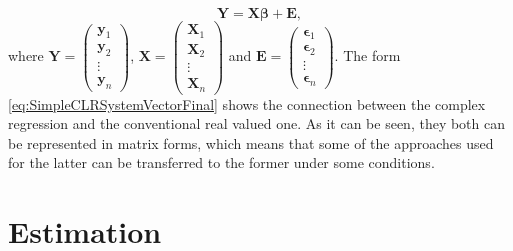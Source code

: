 \documentclass[
]{book}
\begin{document}
\begin{equation}
    \mathbf{Y} = \mathbf{X} \boldsymbol{\beta} + \mathbf{E} ,
    \label{eq:SimpleCLRSystemVectorFinal}
\end{equation}
where \(\mathbf{Y}=\begin{pmatrix}\mathbf{y}_1 \\ \mathbf{y}_2\\ \vdots \\ \mathbf{y}_n \end{pmatrix}\), \(\mathbf{X}=\begin{pmatrix}\mathbf{X}_1 \\ \mathbf{X}_2\\ \vdots \\ \mathbf{X}_n \end{pmatrix}\) and \(\mathbf{E}=\begin{pmatrix}\boldsymbol{\epsilon}_1 \\ \boldsymbol{\epsilon}_2\\ \vdots \\ \boldsymbol{\epsilon}_n \end{pmatrix}\). The form \eqref{eq:SimpleCLRSystemVectorFinal} shows the connection between the complex regression and the conventional real valued one. As it can be seen, they both can be represented in matrix forms, which means that some of the approaches used for the latter can be transferred to the former under some conditions.

\hypertarget{SCLREstimation}{%
\section{Estimation}\label{SCLREstimation}}
\end{document}
